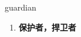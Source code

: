 
\begin{frame}
{\huge guardian}
\begin{center}
\begin{enumerate}\Large
  \item \textbf{保护者，捍卫者}
\end{enumerate}
\end{center}
\end{frame}
